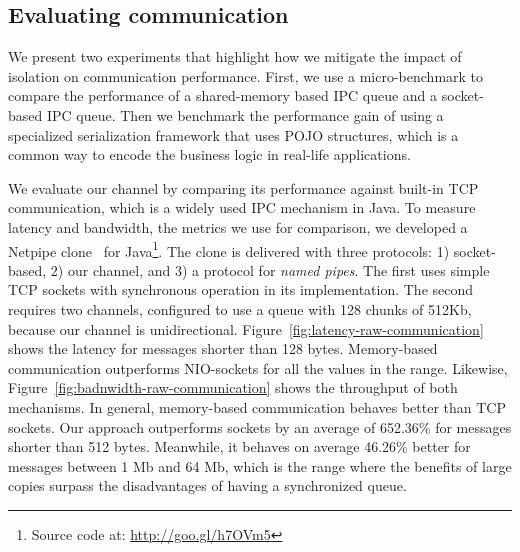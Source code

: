 \subsection{Evaluating communication}
We present two experiments that highlight how we mitigate the impact of isolation on communication performance. %
First, we use a micro-benchmark to compare the performance of a shared-memory based IPC queue and a socket-based IPC queue. %
Then we benchmark the performance gain of using a specialized serialization framework that uses POJO structures, which is a common way to encode the business logic in real-life applications.
   
We evaluate our channel by comparing its performance against built-in TCP communication, which is a widely used IPC mechanism in Java.
To measure latency and bandwidth, the metrics we use for comparison, we developed a Netpipe clone~\cite{Snell96netpipe:a} for Java\footnote{Source code at: \url{http://goo.gl/h7OVm5}}.
The clone is delivered with three protocols: 1) socket-based, 2) our channel, and 3) a protocol for \textit{named pipes}.
The first uses simple TCP sockets with synchronous operation in its implementation. 
The second requires two channels, configured to use a queue with 128 chunks of 512Kb, because our channel is unidirectional.
Figure~\ref{fig:latency-raw-communication} shows the latency for messages shorter than 128 bytes.
Memory-based communication outperforms NIO-sockets for all the values in the range.
Likewise, Figure~\ref{fig:badnwidth-raw-communication} shows the throughput of both mechanisms.
In general, memory-based communication behaves better than TCP sockets.
Our approach outperforms sockets by an average of 652.36\% for messages shorter than 512 bytes.
Meanwhile, it behaves on average 46.26\% better for messages between 1 Mb and 64 Mb, which is the range where the benefits of large copies surpass the disadvantages of having a synchronized queue.

